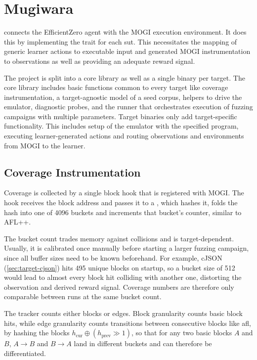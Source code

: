 
\section{Mugiwara}\label{sec:impl-mugiwara}

 connects the EfficientZero agent with the MOGI execution environment.
It does this by implementing the  trait for each \gls{sut}.
This necessitates the mapping of generic learner actions to executable input and
generated MOGI instrumentation to observations as well as providing an adequate
reward signal.

The project is split into a core library as well as a single binary per target.
The core library includes basic functions common to every target like coverage instrumentation,
a target-agnostic model of a seed corpus, helpers to drive the emulator, diagnostic probes,
and the runner that orchestrates execution of fuzzing campaigns with multiple parameters.
Target binaries only add target-specific functionality.
This includes setup of the emulator with the specified program, executing learner-generated
actions and routing observations and environments from MOGI to the learner.

\subsection{Coverage Instrumentation}\label{sec:impl-coverage}

Coverage is collected by a single block hook that is registered with MOGI.
The hook receives the block address and passes it to a ,
which hashes it, folds the hash into one of 4096 buckets and increments that bucket's counter,
similar to AFL++.

The bucket count trades memory against collisions and is target-dependent.
Usually, it is calibrated once manually before starting a larger fuzzing campaign,
since all buffer sizes need to be known beforehand.
For example, cJSON (\cref{sec:target-cjson}) hits 495 unique blocks on startup, so a bucket
size of 512 would lead to almost every block hit colliding with another one, distorting
the observation and derived reward signal.
Coverage numbers are therefore only comparable between runs at the same bucket count.

The tracker counts either blocks or edges.
Block granularity counts basic block hits, while edge granularity counts
transitions between consecutive blocks like \acrshort{afl}, by hashing the
blocks $h_\text{cur}\oplus(h_\text{prev}\gg 1)$, so that for any two basic
blocks $A$ and $B$, $A\rightarrow B$ and $B\rightarrow A$ land in different
buckets and can therefore be differentiated.

